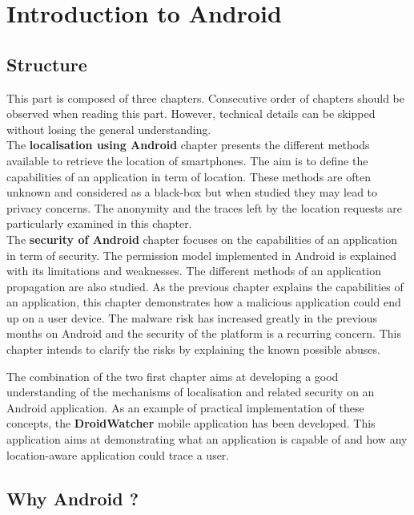 \chapter{Introduction to Android}
\label{chap:andro-intro}

\section*{Structure}
\label{sec:intro-andro-structure}
This part is composed of three chapters.
Consecutive order of chapters should be observed when reading this part.
However, technical details can be skipped without losing the general understanding.\\

The \textbf{localisation using Android} chapter presents the different methods available to retrieve the location of smartphones.
The aim is to define the capabilities of an application in term of location.
These methods are often unknown and considered as a black-box but when studied they may lead to privacy concerns.
The anonymity and the traces left by the location requests are particularly examined in this chapter.\\

The \textbf{security of Android} chapter focuses on the capabilities of an application in term of security.
The permission model implemented in Android is explained with its limitations and weaknesses.
The different methods of an application propagation are also studied.
As the previous chapter explains the capabilities of an application, this chapter demonstrates how a malicious application could end up on a user device.
The malware risk has increased greatly in the previous months on Android and the security of the platform is a recurring concern.
This chapter intends to clarify the risks by explaining the known possible abuses.

The combination of the two first chapter aims at developing a good understanding of the mechanisms of localisation and related security on an Android application.
As an example of practical implementation of these concepts, the \textbf{DroidWatcher} mobile application has been developed.
This application aims at demonstrating what an application is capable of and how any location-aware application could trace a user.

\section*{Why Android ?}
\label{sec:why-android}

